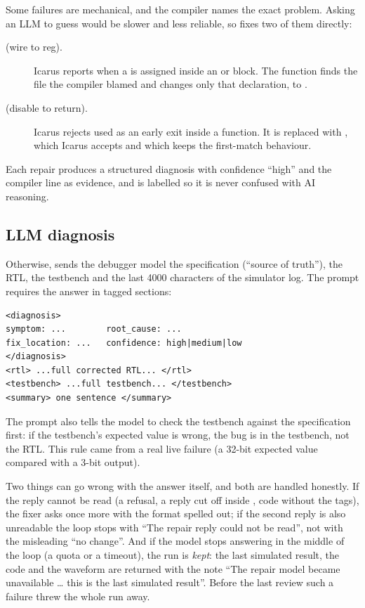 Some failures are mechanical, and the compiler names the exact problem. Asking an LLM to guess would be slower and less reliable, so  fixes two of them directly:

\begin{description}
  \item[ (wire to reg).] Icarus reports  when a  is assigned inside an  or  block. The function finds the file the compiler blamed and changes only that declaration,  to .
  \item[ (disable to return).] Icarus rejects  used as an early exit inside a function. It is replaced with , which Icarus accepts and which keeps the first-match behaviour.
\end{description}

Each repair produces a structured diagnosis with confidence ``high'' and the compiler line as evidence, and is labelled  so it is never confused with AI reasoning.

\subsection{LLM diagnosis}

Otherwise,  sends the debugger model the specification (``source of truth''), the RTL, the testbench and the last 4000 characters of the simulator log. The prompt requires the answer in tagged sections:

\begin{lstlisting}[style=plain]
<diagnosis>
symptom: ...        root_cause: ...
fix_location: ...   confidence: high|medium|low
</diagnosis>
<rtl> ...full corrected RTL... </rtl>
<testbench> ...full testbench... </testbench>
<summary> one sentence </summary>
\end{lstlisting}

The prompt also tells the model to check the testbench against the specification first: if the testbench's expected value is wrong, the bug is in the testbench, not the RTL. This rule came from a real live failure (a 32-bit expected value compared with a 3-bit output).

Two things can go wrong with the answer itself, and both are handled honestly. If the reply cannot be read (a refusal, a reply cut off inside , code without the tags), the fixer asks once more with the format spelled out; if the second reply is also unreadable the loop stops with ``The repair reply could not be read'', not with the misleading ``no change''. And if the model stops answering in the middle of the loop (a quota or a timeout), the run is \emph{kept}: the last simulated result, the code and the waveform are returned with the note ``The repair model became unavailable \ldots{} this is the last simulated result''. Before the last review such a failure threw the whole run away.

